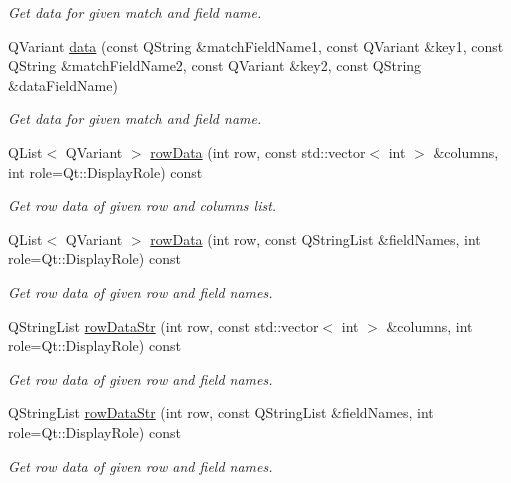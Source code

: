 \begin{DoxyCompactItemize}
\begin{DoxyCompactList}\small\item\em Get data for given match and field name. \end{DoxyCompactList}\item 
Q\-Variant \hyperlink{classmdt_abstract_sql_table_controller_a3b6e51c1d21ac2d0c045c5e798370046}{data} (const Q\-String \&match\-Field\-Name1, const Q\-Variant \&key1, const Q\-String \&match\-Field\-Name2, const Q\-Variant \&key2, const Q\-String \&data\-Field\-Name)
\begin{DoxyCompactList}\small\item\em Get data for given match and field name. \end{DoxyCompactList}\item 
Q\-List$<$ Q\-Variant $>$ \hyperlink{classmdt_abstract_sql_table_controller_a5484649a8a0ad44c78b5f17471de2a49}{row\-Data} (int row, const std\-::vector$<$ int $>$ \&columns, int role=Qt\-::\-Display\-Role) const 
\begin{DoxyCompactList}\small\item\em Get row data of given row and columns list. \end{DoxyCompactList}\item 
Q\-List$<$ Q\-Variant $>$ \hyperlink{classmdt_abstract_sql_table_controller_a237cb7894646edd1e790e3066ebf7319}{row\-Data} (int row, const Q\-String\-List \&field\-Names, int role=Qt\-::\-Display\-Role) const 
\begin{DoxyCompactList}\small\item\em Get row data of given row and field names. \end{DoxyCompactList}\item 
Q\-String\-List \hyperlink{classmdt_abstract_sql_table_controller_a327acbde1979ba113a621dc3d8be7f78}{row\-Data\-Str} (int row, const std\-::vector$<$ int $>$ \&columns, int role=Qt\-::\-Display\-Role) const 
\begin{DoxyCompactList}\small\item\em Get row data of given row and field names. \end{DoxyCompactList}\item 
Q\-String\-List \hyperlink{classmdt_abstract_sql_table_controller_a7704d947a45401c1805a37eeee90b439}{row\-Data\-Str} (int row, const Q\-String\-List \&field\-Names, int role=Qt\-::\-Display\-Role) const 
\begin{DoxyCompactList}\small\item\em Get row data of given row and field names. \end{DoxyCompactList}\item 

\end{DoxyCompactItemize}
